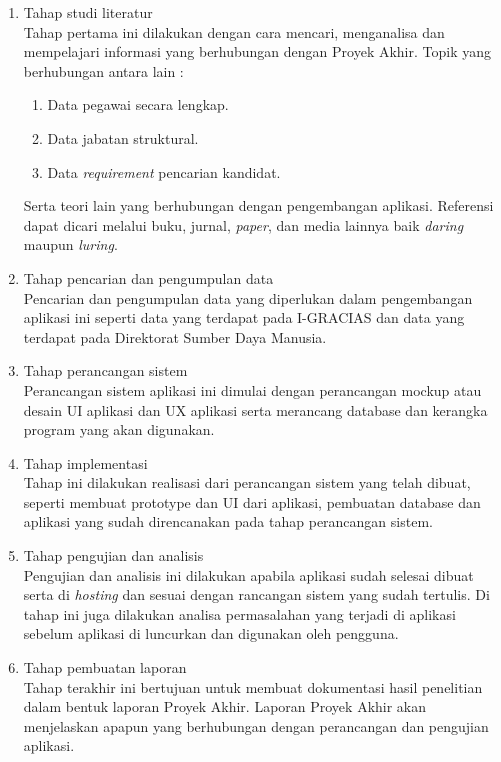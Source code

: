 \begin{enumerate}
	\item Tahap studi literatur \\
	Tahap pertama ini dilakukan dengan cara mencari, menganalisa dan 		mempelajari informasi yang berhubungan dengan Proyek Akhir. Topik yang berhubungan antara lain : 
	\begin{enumerate}
	\item Data pegawai secara lengkap.
	\item Data jabatan struktural.
	\item Data \textit{requirement} pencarian kandidat. 
	\end{enumerate}
	Serta teori lain yang berhubungan dengan pengembangan aplikasi. Referensi dapat dicari melalui buku, jurnal, \textit{paper}, dan media lainnya baik \textit{daring} maupun \textit{luring}.
	\item	Tahap pencarian dan pengumpulan data \\
	Pencarian dan pengumpulan data yang diperlukan dalam pengembangan aplikasi ini seperti data yang terdapat pada I-GRACIAS dan data yang terdapat pada Direktorat Sumber Daya Manusia.
	\\
	\item	Tahap perancangan sistem \\
	Perancangan sistem aplikasi ini dimulai dengan perancangan mockup atau desain UI aplikasi dan UX aplikasi serta merancang database dan kerangka program yang akan digunakan.
	\item Tahap implementasi \\
	Tahap ini dilakukan realisasi dari perancangan sistem yang telah dibuat, seperti membuat prototype dan UI dari aplikasi, pembuatan database dan aplikasi yang sudah direncanakan pada tahap perancangan sistem.
	\item Tahap pengujian dan analisis \\
	Pengujian dan analisis ini dilakukan apabila aplikasi sudah selesai dibuat serta di \textit{hosting} dan sesuai dengan rancangan sistem yang sudah tertulis. Di tahap ini juga dilakukan analisa permasalahan yang terjadi di aplikasi sebelum aplikasi di luncurkan dan digunakan oleh pengguna.
	\item	Tahap pembuatan laporan \\
	Tahap terakhir ini bertujuan untuk membuat dokumentasi hasil penelitian dalam bentuk laporan Proyek Akhir. Laporan Proyek Akhir akan menjelaskan apapun yang berhubungan dengan perancangan dan pengujian aplikasi.  
	
\end{enumerate}


